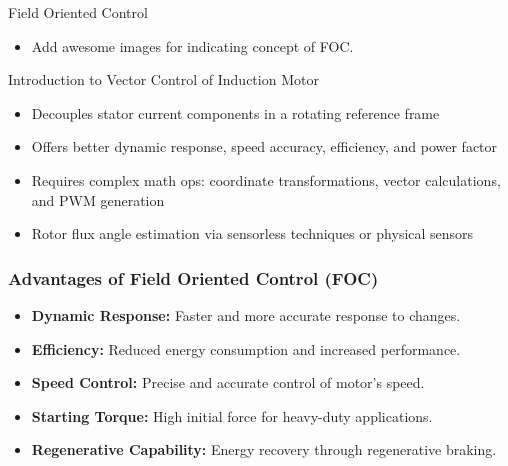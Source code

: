 


\begin{frame}{}
	\maketitle
\end{frame}

\begin{frame}{Field Oriented Control}
	\begin{itemize}
		\item Add awesome images for indicating concept of FOC.
	\end{itemize}
\end{frame}


\begin{frame}{Introduction to Vector Control of Induction Motor}
	\begin{itemize}
		\item Decouples stator current components in a rotating reference frame
		\item Offers better dynamic response, speed accuracy, efficiency, and power factor
		\item Requires complex math ops: coordinate transformations, vector calculations, and PWM generation
		\item Rotor flux angle estimation via sensorless techniques or physical sensors
	\end{itemize}
\end{frame}

\begin{frame}
	\frametitle{Advantages of Field Oriented Control (FOC)}
	\begin{itemize}
		\item \textbf{Dynamic Response:} Faster and more accurate response to changes.
		\item \textbf{Efficiency:} Reduced energy consumption and increased performance.
		\item \textbf{Speed Control:} Precise and accurate control of motor's speed.
		\item \textbf{Starting Torque:} High initial force for heavy-duty applications.
		\item \textbf{Regenerative Capability:} Energy recovery through regenerative braking.
	\end{itemize}
\end{frame}


